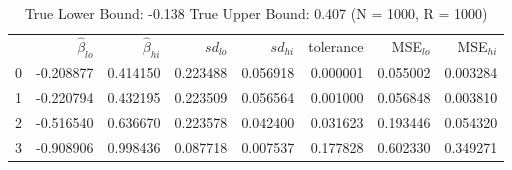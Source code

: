 \begin{table}
\caption{True Lower Bound: -0.138 True Upper Bound: 0.407 (N = 1000, R = 1000)}
\begin{tabular}{lrrrrrrr}
 & $\hat{\beta}_{lo}$ & $\hat{\beta}_{hi}$ & $sd_{lo}$ & $sd_{hi}$ & tolerance & MSE$_{lo}$ & MSE$_{hi}$ \\
0 & -0.208877 & 0.414150 & 0.223488 & 0.056918 & 0.000001 & 0.055002 & 0.003284 \\
1 & -0.220794 & 0.432195 & 0.223509 & 0.056564 & 0.001000 & 0.056848 & 0.003810 \\
2 & -0.516540 & 0.636670 & 0.223578 & 0.042400 & 0.031623 & 0.193446 & 0.054320 \\
3 & -0.908906 & 0.998436 & 0.087718 & 0.007537 & 0.177828 & 0.602330 & 0.349271 \\
\end{tabular}
\end{table}
